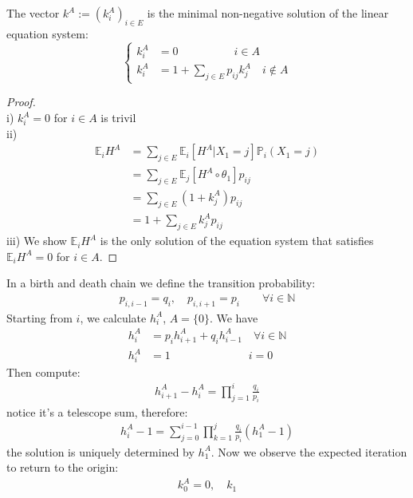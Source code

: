 \begin{theorem}
	The vector $k^A := (k_i^A)_{i \in E}$ is the minimal non-negative solution of the linear equation system:
	\begin{equation*}
	\left\{
	\begin{aligned}
		k_i^A &= 0 \qquad \qquad \quad i \in A\\
		k_i^A &= 1 +  \sum_{j \in E} p_{ij}k_j^A  \quad i \notin A
	\end{aligned}
	\right.
	\end{equation*}
\end{theorem}
\begin{proof}
\quad\\i) $k_i^A = 0$ for $i \in A$ is trivil\\
ii)
\begin{align*}
	\mathbb{E}_iH^A &=  \sum_{j \in E} \mathbb{E}_i[H^A|X_1 = j]\mathbb{P}_i(X_1 = j)\\
	&= \sum_{j \in E}\mathbb{E}_j[H^A \circ \theta_1]p_{ij}\\
	&= \sum_{j \in E}(1+k_j^A) p_{ij}\\
	&= 1 + \sum_{j \in E} k_j^A p_{ij}
\end{align*}
iii) We show $\mathbb{E}_i H^A$ is the only solution of the equation system that satisfies $\mathbb{E}_iH^A = 0$ for $i \in A$.
\end{proof}

\begin{example}
	In a birth and death chain we define the transition probability:
	\begin{align*}
		p_{i, i-1} = q_i,\quad p_{i, i+1} = p_i \qquad \forall i \in \mathbb{N}
	\end{align*}
	Starting from $i$, we calculate $h_i^A$, $A = \{0\}$. We have
	\begin{align*}
		h_i^A &= p_ih_{i+1}^A + q_i h_{i-1}^A  \quad \forall i \in \mathbb{N}\\
		h_i^A &= 1 \quad \qquad \qquad\qquad i = 0
	\end{align*}
	Then compute:
	\begin{align*}
		h_{i+1}^A - h_i^A = \prod_{j = 1}^i \frac{q_i}{p_i}
	\end{align*}
	notice it's a telescope sum, therefore:
	\begin{align*}
		h_i^A - 1 = \sum_{j = 0}^{i-1} \prod_{k = 1}^j \frac{q_i}{p_i}(h_1^A - 1)
	\end{align*}
	the solution is uniquely determined by $h_1^A$. Now we observe the expected iteration to return to the origin:
	\begin{align*}
		k_0^A = 0, \quad k_1
	\end{align*}
\end{example}

